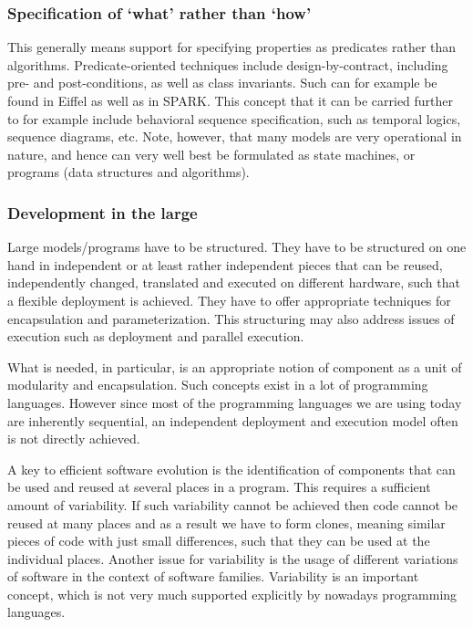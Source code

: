 \subsubsection{Specification of `what' rather than `how'}

This generally means support for specifying properties as predicates
rather than algorithms. Predicate-oriented techniques include
design-by-contract, including pre- and post-conditions, as well 
as class invariants. Such can for example be found in Eiffel as 
well as in SPARK. This concept that it can be carried 
further to for example include behavioral sequence specification, 
such as temporal logics, sequence diagrams, etc.
Note, however, that many models are very operational in
nature, and hence can very well best be formulated as state machines,
or programs (data structures and algorithms). 


\subsubsection{Development in the large}

Large models/programs have to be structured. They have to be structured on 
one hand in independent or at least rather independent pieces that 
can be reused, independently changed, translated and executed on 
different hardware, such that a flexible deployment is achieved. 
They have to offer appropriate techniques for encapsulation and 
parameterization. This structuring may also address issues of 
execution such as deployment and parallel execution.

What is needed, in particular, is an appropriate notion of 
component as a unit of modularity and encapsulation. Such concepts 
exist in a lot of programming languages. However since most of the 
programming languages we are using today are inherently sequential, 
an independent deployment and execution model often is not directly 
achieved.

A key to efficient software evolution is the identification of 
components that can be used and reused at several places in a 
program. This requires a sufficient amount of variability. If such 
variability cannot be achieved then code cannot be reused at many 
places and as a result we have to form clones, meaning similar 
pieces of code with just small differences, such that they can be 
used at the individual places. Another issue for variability is the 
usage of different variations of software in the context of 
software families. Variability is an important concept, which is 
not very much supported explicitly by nowadays programming 
languages.


